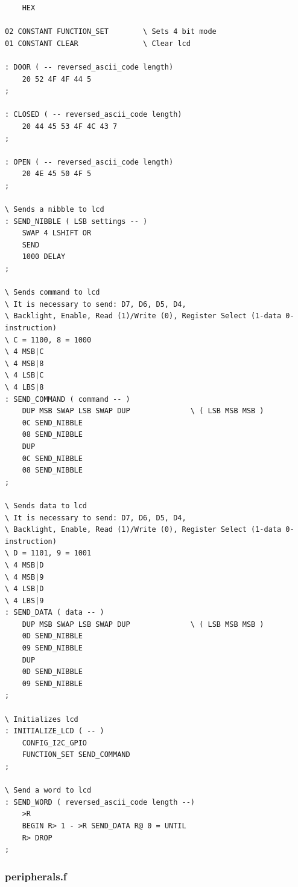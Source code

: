\documentclass[]{article}
\begin{document}
\begin{verbatim}
    HEX

02 CONSTANT FUNCTION_SET        \ Sets 4 bit mode
01 CONSTANT CLEAR               \ Clear lcd 

: DOOR ( -- reversed_ascii_code length)
    20 52 4F 4F 44 5 
;

: CLOSED ( -- reversed_ascii_code length)
    20 44 45 53 4F 4C 43 7
;

: OPEN ( -- reversed_ascii_code length)
    20 4E 45 50 4F 5
;

\ Sends a nibble to lcd 
: SEND_NIBBLE ( LSB settings -- )
    SWAP 4 LSHIFT OR
    SEND
    1000 DELAY
;

\ Sends command to lcd 
\ It is necessary to send: D7, D6, D5, D4, 
\ Backlight, Enable, Read (1)/Write (0), Register Select (1-data 0-instruction)
\ C = 1100, 8 = 1000
\ 4 MSB|C 
\ 4 MSB|8
\ 4 LSB|C
\ 4 LBS|8
: SEND_COMMAND ( command -- )
    DUP MSB SWAP LSB SWAP DUP              \ ( LSB MSB MSB )
    0C SEND_NIBBLE 
    08 SEND_NIBBLE 
    DUP 
    0C SEND_NIBBLE
    08 SEND_NIBBLE
;

\ Sends data to lcd 
\ It is necessary to send: D7, D6, D5, D4, 
\ Backlight, Enable, Read (1)/Write (0), Register Select (1-data 0-instruction)
\ D = 1101, 9 = 1001
\ 4 MSB|D
\ 4 MSB|9
\ 4 LSB|D
\ 4 LBS|9
: SEND_DATA ( data -- ) 
    DUP MSB SWAP LSB SWAP DUP              \ ( LSB MSB MSB )
    0D SEND_NIBBLE  
    09 SEND_NIBBLE 
    DUP 
    0D SEND_NIBBLE
    09 SEND_NIBBLE 
;

\ Initializes lcd 
: INITIALIZE_LCD ( -- )
    CONFIG_I2C_GPIO
    FUNCTION_SET SEND_COMMAND
;

\ Send a word to lcd
: SEND_WORD ( reversed_ascii_code length --)
    >R 
    BEGIN R> 1 - >R SEND_DATA R@ 0 = UNTIL 
    R> DROP
;

\end{verbatim}

\subsubsection{peripherals.f}
\end{document}
